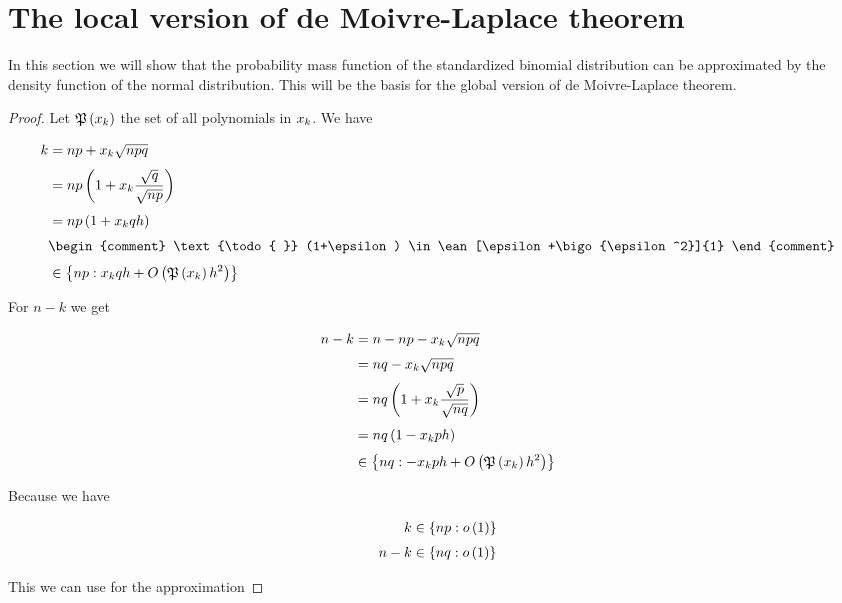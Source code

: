 \section{The local version of de Moivre-Laplace theorem}

In this section we will show that the probability mass function of the standardized binomial distribution can be approximated by the density function of the normal distribution. This will be the basis for the global version of de Moivre-Laplace theorem.

\begin{theorem}
\end{theorem}

\begin{proof}
  Let $\mathfrak P\left( {x_{k}} \right)$ the set of all polynomials in $x_{k}$. We have

  \begin{align}
    k &= np + \x \sqrt{npq} \nl
    &= np \left( 1 + \x \frac{\sqrt{q}}{\sqrt{np}}\right) \nl
    &= np \left( 1 + \x q h\right) \nl
    &
    \begin{comment}
      \text{\todo{ }} (1+\epsilon) \in \ean[\epsilon+\bigo{\epsilon^2}]{1}
    \end{comment} \nl
    &\in \ean[\x qh + \bigo{\pol{\x }h^2}]{np}
  \end{align}

  \noindent For $n-k$ we get

  \begin{align}
    n-k &= n-np-\x\sqrt{npq} \nl
    &= nq -\x \sqrt{npq} \nl
    &= nq \left( 1 + \x \frac{\sqrt p}{\sqrt{nq}}\right) \nl
    &= nq \left( 1 - \x p h\right) \nl
    &\in \ean[-\x ph + \bigo{\pol{\x} h^2}]{nq}
  \end{align}


  Because  we have

  \begin{align}
    k & \in \ean[\littleo{1}]{np} \nl
    n-k & \in \ean[\littleo{1}]{nq}
  \end{align}

  \noindent This we can use for the approximation


\end{proof}
